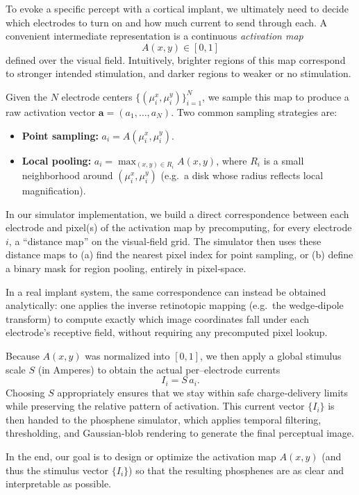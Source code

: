 To evoke a specific percept with a cortical implant, we ultimately need to decide which electrodes to turn on and how much current to send through each.  A convenient intermediate representation is a continuous \emph{activation map} 
\[
  A(x,y)\in[0,1]
\]
defined over the visual field.  Intuitively, brighter regions of this map correspond to stronger intended stimulation, and darker regions to weaker or no stimulation.  

Given the $N$ electrode centers \(\{(\mu_i^x,\mu_i^y)\}_{i=1}^N\), we sample this map to produce a raw activation vector \(\mathbf{a}=(a_1,\dots,a_N)\).  Two common sampling strategies are:

\begin{itemize}
  \item \textbf{Point sampling:}  
    \(\displaystyle a_i = A(\mu_i^x,\mu_i^y)\).
  \item \textbf{Local pooling:}  
    \(\displaystyle a_i = \max_{(x,y)\in R_i} A(x,y)\), where \(R_i\) is a small neighborhood around \((\mu_i^x,\mu_i^y)\) (e.g.\ a disk whose radius reflects local magnification).
\end{itemize}

In our simulator implementation, we build a direct correspondence between each electrode and pixel(s) of the activation map by precomputing, for every electrode \(i\), a “distance map” on the visual‐field grid.  The simulator then uses these distance maps to (a) find the nearest pixel index for point sampling, or (b) define a binary mask for region pooling, entirely in pixel‐space.  

In a real implant system, the same correspondence can instead be obtained analytically: one applies the inverse retinotopic mapping (e.g.\ the wedge‐dipole transform) to compute exactly which image coordinates fall under each electrode’s receptive field, without requiring any precomputed pixel lookup.

Because \(A(x,y)\) was normalized into \([0,1]\), we then apply a global stimulus scale \(S\) (in Amperes) to obtain the actual per–electrode currents
\[
  I_i = S\,a_i.
\]
Choosing \(S\) appropriately ensures that we stay within safe charge‐delivery limits while preserving the relative pattern of activation.  This current vector \(\{I_i\}\) is then handed to the phosphene simulator, which applies temporal filtering, thresholding, and Gaussian‐blob rendering to generate the final perceptual image.  

In the end, our goal is to design or optimize the activation map \(A(x,y)\) (and thus the stimulus vector \(\{I_i\}\)) so that the resulting phosphenes are as clear and interpretable as possible.


